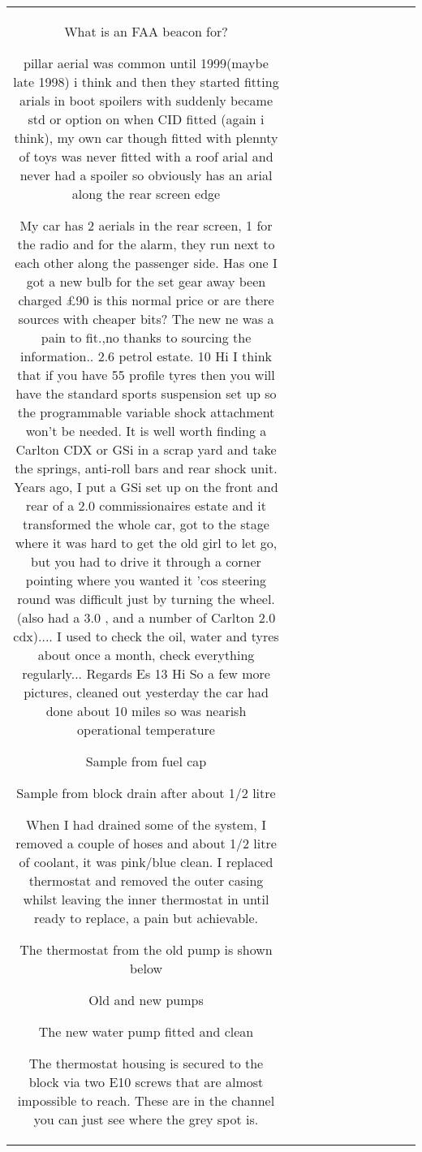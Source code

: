 \begin{table}[h!]
\begin{tabular}{|c|c|c|c|c|c|c|c|c|c|c|}
What is an FAA beacon for?

pillar aerial was common until 1999(maybe late 1998) i think and then they started fitting arials in boot spoilers with suddenly became std or option on when CID fitted (again i think), my own car though fitted with plennty of toys was never fitted with a roof arial and never had a spoiler so obviously has an arial along the rear screen edge

My car has 2 aerials in the rear screen, 1 for the radio and for the alarm, they run next to each other along the passenger side.
Has one I got a new bulb for the set gear away been charged £90 is this normal price or are there sources with cheaper bits?
The new ne was a pain to fit.,no thanks to sourcing the information..
2.6 petrol estate.
10
Hi
I think that if you have 55 profile tyres then you will have the standard sports suspension set up so the programmable variable shock attachment won't be needed. It is well worth finding a Carlton CDX or GSi in a scrap yard and take the springs, anti-roll bars and rear shock unit. Years ago, I put a GSi set up on the front and rear of a 2.0 commissionaires estate and it transformed the whole car, got to the stage where it was hard to get the old girl to let go, but you had to drive it through a corner pointing where you wanted it 'cos steering round was difficult just by turning the wheel. (also had a 3.0 , and a number of Carlton 2.0 cdx)....
I used to check the oil, water and tyres about once a month, check everything regularly...
Regards
Es
13
Hi
So a few more pictures, cleaned out yesterday the car had done about 10 miles so was nearish operational temperature

Sample from fuel cap


Sample from block drain after about 1/2 litre


When I had drained some of the system, I removed a couple of hoses and about 1/2 litre of coolant, it was pink/blue clean.
I replaced thermostat and removed the outer casing whilst leaving the inner thermostat in until ready to replace, a pain but achievable.

The thermostat from the old pump is shown below


Old and new pumps


The new water pump fitted and clean



The thermostat housing is secured to the block via two E10 screws that are almost impossible to reach.
These are in the channel you can just see where the grey spot is.



\end{tabular}
\end{table}
